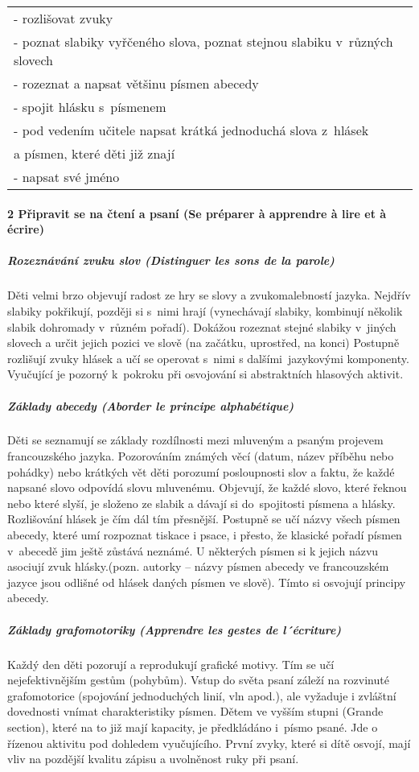 				\begin{center}
				\begin{tabular}{l}
					- rozlišovat zvuky 	\\
					- poznat slabiky vyřčeného slova, poznat stejnou slabiku v různých slovech 	\\
					- rozeznat a napsat většinu písmen abecedy 	\\
					- spojit hlásku s písmenem 	\\
					- pod vedením učitele napsat krátká jednoduchá slova z hlásek \\
					 \; a písmen, které děti již znají 	\\
					- napsat své jméno
				\end{tabular}
				\end{center}


			\paragraph*{2 Připravit se na čtení a psaní (Se préparer à apprendre à lire et à écrire)}
				\subparagraph{Rozeznávání zvuku slov (Distinguer les sons de la parole)}
					Děti velmi brzo objevují radost ze hry se slovy a zvukomalebností jazyka. Nejdřív slabiky pokřikují, později si s nimi hrají (vynechávají slabiky, kombinují několik slabik dohromady v různém pořadí). Dokážou rozeznat stejné slabiky v jiných slovech a určit jejich pozici ve slově (na začátku, uprostřed, na konci)
					Postupně rozlišují zvuky hlásek a učí se operovat s nimi s dalšími jazykovými komponenty. Vyučující je pozorný k pokroku při osvojování si abstraktních hlasových aktivit.
				\subparagraph{Základy abecedy (Aborder le principe alphabétique)}
					Děti se seznamují se základy rozdílnosti mezi mluveným a psaným projevem francouzského jazyka. Pozorováním známých věcí (datum, název příběhu nebo pohádky) nebo krátkých vět děti porozumí posloupnosti slov a faktu, že každé napsané slovo odpovídá slovu mluvenému. 
					Objevují, že každé slovo, které řeknou nebo které slyší, je složeno ze slabik a dávají si do spojitosti písmena a hlásky. Rozlišování hlásek je čím dál tím přesnější. Postupně se učí názvy všech písmen abecedy, které umí rozpoznat tiskace i psace, i přesto, že klasické pořadí písmen v abecedě jim ještě zůstává neznámé. U některých písmen si k jejich názvu asociují zvuk hlásky.(pozn. autorky – názvy písmen abecedy ve francouzském jazyce jsou odlišné od hlásek daných písmen ve slově). Tímto si osvojují principy abecedy.
				\subparagraph{Základy grafomotoriky (Apprendre les gestes de l´écriture)} 
					Každý den děti pozorují a reprodukují grafické motivy. Tím se učí nejefektivnějším gestům (pohybům). Vstup do světa psaní záleží na rozvinuté grafomotorice (spojování jednoduchých linií, vln apod.), ale vyžaduje i zvláštní dovednosti vnímat charakteristiky písmen. 
					Dětem ve vyšším stupni (Grande section), které na to již mají kapacity, je předkládáno i písmo psané. Jde o řízenou aktivitu pod dohledem vyučujícího. První zvyky, které si dítě osvojí, mají vliv na pozdější kvalitu zápisu a uvolněnost ruky při psaní. 
					
